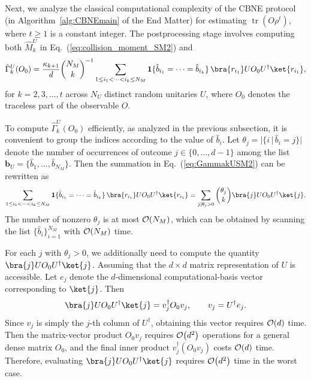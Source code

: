 \documentclass[aps,prl,twocolumn,nofootinbib,superscriptaddress,10pt]{revtex4-2}
\let\originalleft\left
\let\originalright\right
\renewcommand{\left}{\mathopen{}\mathclose\bgroup\originalleft}
\renewcommand{\right}{\aftergroup\egroup\originalright}
\DeclareMathOperator{\Tr}{tr}
\newcommand{\bigo}[1]{\mathcal{O}\left(#1\right)}
\theoremstyle{plain}
\theoremstyle{definition}
\newcommand{\eref}[1]{Eq.~\textup{(\ref{#1})}}
\begin{document}
Next, we analyze the classical computational complexity of the CBNE protocol (in Algorithm~\ref{alg:CBNEmain} of the End Matter) for estimating $\Tr(O\rho^t)$, where $t\ge1$ is a constant integer.
The postprocessing stage involves computing both $\hat M_k^U$ in \eref{eq:collision_moment_SM2} and 
\begin{align}\label{eq:GammakUSM2}
\hat{\Gamma}_k^U(O_0)=
\frac{\kappa_{k+1}}{d}\binom{N_M}{k}^{-1}
\sum_{1\le i_1<\cdots<i_k\le N_M}
\mathbf{1}\{\hat{b}_{i_1}=\cdots=\hat{b}_{i_k}\}\,
\bra{r_{i_1}} U O_0 U^{\dag} \ket{r_{i_1}},
\end{align}
for $k=2,3,\dots,t$ across $N_U$ distinct random unitaries $U$, where  $O_0$ denotes the traceless part of the observable $O$.

To compute $\hat{\Gamma}_k^U(O_0)$ efficiently, as analyzed in the previous subsection, it is convenient to group the indices according to the value of $\hat{b}_i$.
Let $\theta_j=\bigl|\{i\,|\,\hat{b}_i=j\}\bigr|$ 
denote the number of occurrences of outcome $j\in\{0,\ldots,d-1\}$ among the list $\mathbf{b}_U=\{\hat{b}_1,\dots,\hat{b}_{N_M}\}$.
Then the summation in \eref{eq:GammakUSM2} can be rewritten as
\begin{equation}\label{eq:GammakUSM3}
\sum_{1\le i_1<\cdots<i_k\le N_M}
\mathbf{1}\{\hat{b}_{i_1}=\cdots=\hat{b}_{i_k}\}\,
\bra{r_{i_1}}U O_0 U^\dag\ket{r_{i_1}}
=
\sum_{j|\theta_j>0}
\binom{\theta_j}{k}
\bra{j}U O_0 U^\dag\ket{j}.
\end{equation}
The number of nonzero 
$\theta_j$ is at most $\bigo{N_M}$, which can be obtained by scanning the list
$\{\hat{b}_i\}_{i=1}^{N_M}$ with $\bigo{N_M}$ time.


For each $j$ with $\theta_j>0$, we additionally need to compute the quantity 
$\bra{j}U O_0 U^\dag\ket{j}$.
Assuming that the $d\times d$ matrix representation of $U$ is accessible. Let $e_j$ denote the $d$-dimensional computational-basis vector corresponding to $\ket{j}$.
Then
\begin{equation}
\bra{j}U O_0 U^\dag\ket{j}
=v_j^\dagger O_0 v_j,\qquad
v_j=U^\dagger e_j.
\end{equation}
Since $v_j$ is simply the $j$-th column of $U^\dagger$, obtaining this vector requires $\bigo{d}$ time.
Then the matrix-vector product $O_0v_j$ requires $\bigo{d^2}$ operations for a general dense matrix $O_0$, and the final inner product $v_j^\dagger (O_0 v_j)$ costs $\bigo{d}$ time.
Therefore, evaluating $\bra{j}U O_0 U^\dag\ket{j}$ requires $\bigo{d^2}$ time in the worst case.
\end{document}
